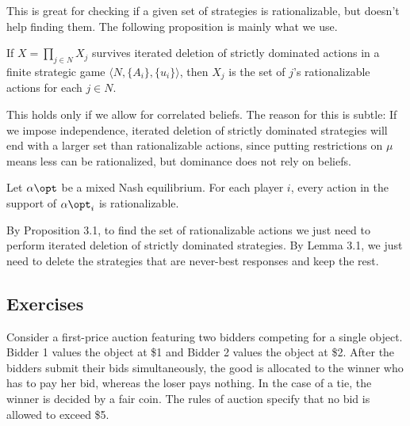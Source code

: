 \documentclass[10pt]{article}
\begin{document}
\begin{remark}
	This is great for checking if a given set of strategies is rationalizable, but doesn't help finding them. The following proposition is mainly what we use.
\end{remark}

\begin{proposition}
	If $X = \prod_{j\in N}X_j$ survives iterated deletion of strictly dominated actions in a finite strategic game $\langle N,\{A_i\},\{u_i\}\rangle$, then $X_j$ is the set of $j$'s rationalizable actions for each $j \in N$.
\end{proposition}
\begin{remark}
	This holds only if we allow for correlated beliefs. The reason for this is subtle: If we impose independence, iterated deletion of strictly dominated strategies will end with a larger set than rationalizable actions, since putting restrictions on $\mu$ means less can be rationalized, but dominance does not rely on beliefs.
\end{remark}

\begin{corollary}
	Let $\alpha\opt$ be a mixed Nash equilibrium. For each player $i$, every action in the support of $\alpha\opt_i$ is rationalizable. 
\end{corollary}

\begin{remark}
	By Proposition 3.1, to find the set of rationalizable actions we just need to perform iterated deletion of strictly dominated strategies. By Lemma 3.1, we just need to delete the strategies that are never-best responses and keep the rest.
\end{remark}

\subsection{Exercises}

Consider a first-price auction featuring two bidders competing for a single object. Bidder 1 values the object at \$1 and Bidder 2 values the object at \$2. After the bidders submit their bids simultaneously, the good is allocated to the winner who has to pay her bid, whereas the loser pays nothing. In the case of a tie, the winner is decided by a fair coin. The rules of auction specify that no bid is allowed to exceed \$5.
\end{document}
